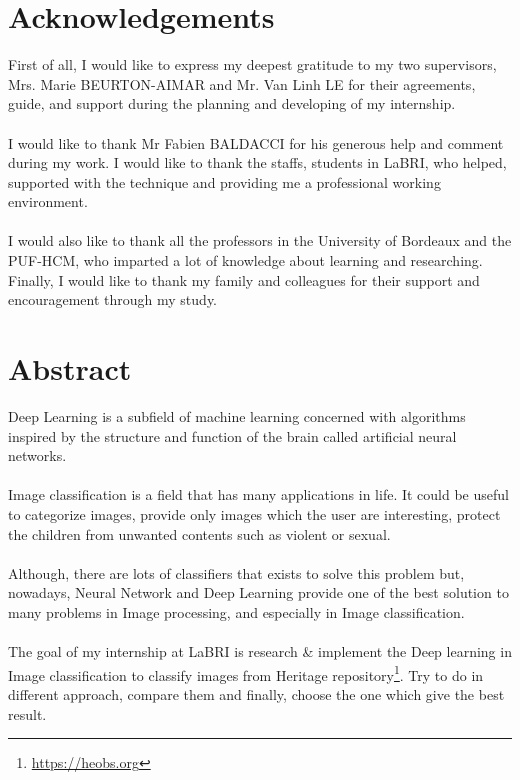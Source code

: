 \documentclass[hidelinks,12pt,a4paper]{report}
\begin{document}
\chapter*{Acknowledgements}

First of all, I would like to express my deepest gratitude to my two supervisors, Mrs. Marie BEURTON-AIMAR and Mr. Van Linh LE for their agreements, guide, and support during the planning and developing of my internship.
\\
\\
I would like to thank Mr Fabien BALDACCI for his generous help and comment during my work. I would like to thank the staffs, students in LaBRI, who helped, supported with the technique and providing me a professional working environment.
\\
\\
I would also like to thank all the professors in the University of Bordeaux and the PUF-HCM, who imparted a lot of knowledge about learning and researching. Finally, I would like to thank my family and colleagues for their support and encouragement through my study.

\clearpage

\chapter*{Abstract}

Deep Learning is a subfield of machine learning concerned with algorithms inspired by the structure and function of the brain called artificial neural networks.
\\
\\
Image classification is a field that has many applications in life. It could be useful to categorize images, provide only images which the user are interesting, protect the children from unwanted contents such as violent or sexual. 
\\
\\
Although, there are lots of classifiers that exists to solve this problem but, nowadays, Neural Network and Deep Learning provide one of the best solution to many problems in Image processing, and especially in Image classification.
\\
\\
The goal of my internship at LaBRI is research \& implement the Deep learning in Image classification to classify images from Heritage repository\footnote{\href{https://heobs.org}{https://heobs.org}}. Try to do in different approach, compare them and finally, choose the one which give the best result.
\tableofcontents
\listoffigures
\thispagestyle{empty}
\clearpage
\end{document}
